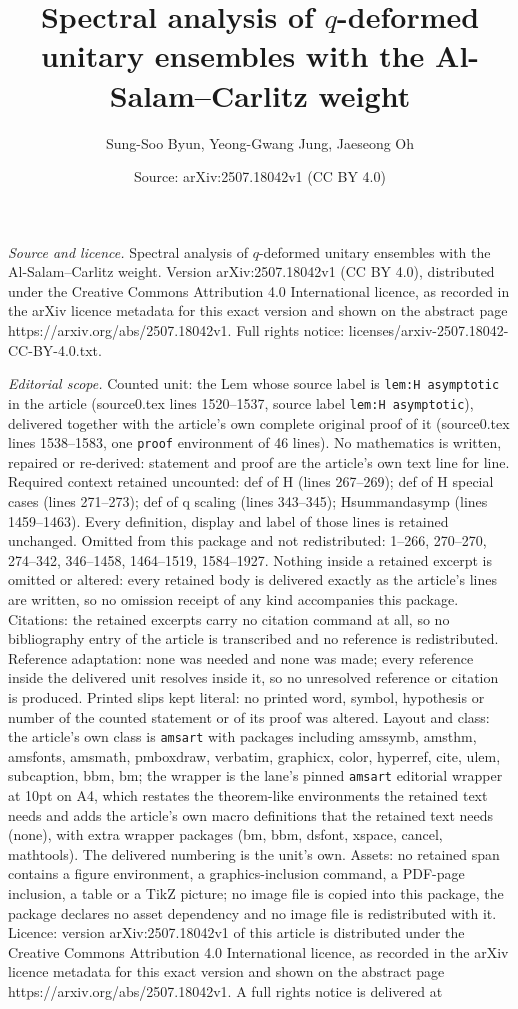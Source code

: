 \documentclass[10pt,a4paper]{amsart}
\title[Spectral analysis of $q$-deformed unitary ensembles with the]{Spectral analysis of $q$-deformed unitary ensembles with the Al-Salam--Carlitz weight}
\author{Sung-Soo Byun, Yeong-Gwang Jung, Jaeseong Oh}
\date{Source: arXiv:2507.18042v1 (CC BY 4.0)}
\begin{document}
\maketitle

\noindent\emph{Source and licence.} Spectral analysis of $q$-deformed unitary ensembles with the Al-Salam--Carlitz weight. Version arXiv:2507.18042v1 (CC BY 4.0), distributed under the Creative Commons Attribution 4.0 International licence, as recorded in the arXiv licence metadata for this exact version and shown on the abstract page https://arxiv.org/abs/2507.18042v1. Full rights notice: licenses/arxiv-2507.18042-CC-BY-4.0.txt.\par\smallskip

\noindent\textit{Editorial scope.} Counted unit: the Lem whose source label is \texttt{lem:H asymptotic} in the article (source0.tex lines 1520--1537, source label \texttt{lem:H asymptotic}), delivered together with the article's own complete original proof of it (source0.tex lines 1538--1583, one \texttt{proof} environment of 46 lines). No mathematics is written, repaired or re-derived: statement and proof are the article's own text line for line. Required context retained uncounted: def of H (lines 267--269); def of H special cases (lines 271--273); def of q scaling (lines 343--345); Hsummandasymp (lines 1459--1463). Every definition, display and label of those lines is retained unchanged. Omitted from this package and not redistributed: 1--266, 270--270, 274--342, 346--1458, 1464--1519, 1584--1927. Nothing inside a retained excerpt is omitted or altered: every retained body is delivered exactly as the article's lines are written, so no omission receipt of any kind accompanies this package. Citations: the retained excerpts carry no citation command at all, so no bibliography entry of the article is transcribed and no reference is redistributed. Reference adaptation: none was needed and none was made; every reference inside the delivered unit resolves inside it, so no unresolved reference or citation is produced. Printed slips kept literal: no printed word, symbol, hypothesis or number of the counted statement or of its proof was altered. Layout and class: the article's own class is \texttt{amsart} with packages including amssymb, amsthm, amsfonts, amsmath, pmboxdraw, verbatim, graphicx, color, hyperref, cite, ulem, subcaption, bbm, bm; the wrapper is the lane's pinned \texttt{amsart} editorial wrapper at 10pt on A4, which restates the theorem-like environments the retained text needs and adds the article's own macro definitions that the retained text needs (none), with extra wrapper packages (bm, bbm, dsfont, xspace, cancel, mathtools). The delivered numbering is the unit's own. Assets: no retained span contains a figure environment, a graphics-inclusion command, a PDF-page inclusion, a table or a TikZ picture; no image file is copied into this package, the package declares no asset dependency and no image file is redistributed with it. Licence: version arXiv:2507.18042v1 of this article is distributed under the Creative Commons Attribution 4.0 International licence, as recorded in the arXiv licence metadata for this exact version and shown on the abstract page https://arxiv.org/abs/2507.18042v1. A full rights notice is delivered at 
\end{document}

